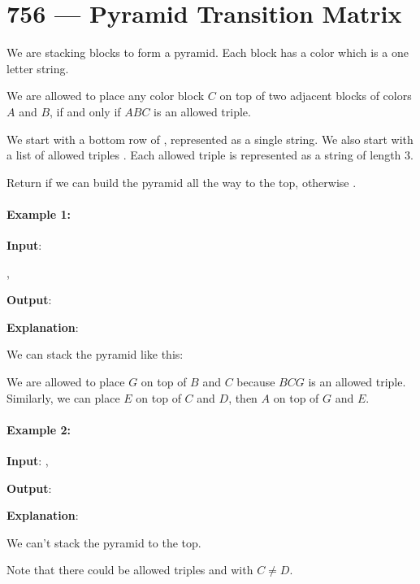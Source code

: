 \section{756 --- Pyramid Transition Matrix}
We are stacking blocks to form a pyramid. Each block has a color which is a one letter string.

We are allowed to place any color block $C$ on top of two adjacent blocks of colors $A$ and $B$, if and only if $ABC$ is an allowed triple.

We start with a bottom row of , represented as a single string. We also start with a list of allowed triples . Each allowed triple is represented as a string of length 3.

Return  if we can build the pyramid all the way to the top, otherwise .

\paragraph{Example 1:}

\begin{flushleft}
\textbf{Input}: 

, 

\textbf{Output}: 

\textbf{Explanation}:

We can stack the pyramid like this:

\begin{figure}[H]
\end{figure}


We are allowed to place $G$ on top of $B$ and $C$ because $BCG$ is an allowed triple.  Similarly, we can place $E$ on top of $C$ and $D$, then $A$ on top of $G$ and $E$.
\end{flushleft}

 

\paragraph{Example 2:}
\begin{flushleft}


\textbf{Input}: , 

\textbf{Output}: 

\textbf{Explanation}:

We can't stack the pyramid to the top.

Note that there could be allowed triples  and  with $C \neq D$.

\end{flushleft} 

